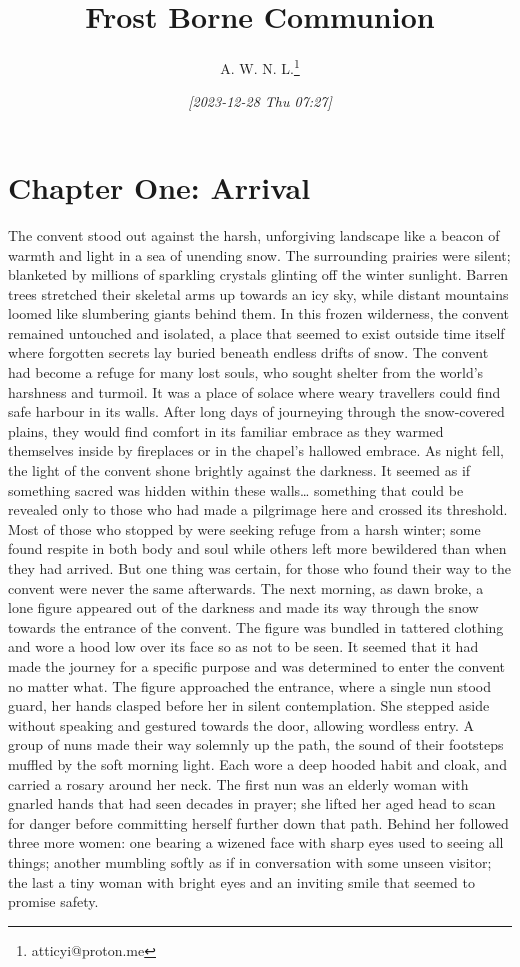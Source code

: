 \documentclass[11pt]{article}
\author{A. W. N. L.\thanks{atticyi@proton.me}}
\date{\textit{[2023-12-28 Thu 07:27]}}
\title{Frost Borne Communion}
\begin{document}
\maketitle
\tableofcontents

\section{Chapter One: Arrival}
\label{sec:orge59237a}
The convent stood out against the harsh, unforgiving landscape like a beacon of warmth and light in a sea of unending snow. The surrounding prairies were silent; blanketed by millions of sparkling crystals glinting off the winter sunlight. Barren trees stretched their skeletal arms up towards an icy sky, while distant mountains loomed like slumbering giants behind them. In this frozen wilderness, the convent remained untouched and isolated, a place that seemed to exist outside time itself where forgotten secrets lay buried beneath endless drifts of snow.
The convent had become a refuge for many lost souls, who sought shelter from the world's harshness and turmoil. It was a place of solace where weary travellers could find safe harbour in its walls. After long days of journeying through the snow-covered plains, they would find comfort in its familiar embrace as they warmed themselves inside by fireplaces or in the chapel's hallowed embrace.
As night fell, the light of the convent shone brightly against the darkness. It seemed as if something sacred was hidden within these walls\ldots{} something that could be revealed only to those who had made a pilgrimage here and crossed its threshold.
Most of those who stopped by were seeking refuge from a harsh winter; some found respite in both body and soul while others left more bewildered than when they had arrived. But one thing was certain, for those who found their way to the convent were never the same afterwards.
The next morning, as dawn broke, a lone figure appeared out of the darkness and made its way through the snow towards the entrance of the convent. The figure was bundled in tattered clothing and wore a hood low over its face so as not to be seen. It seemed that it had made the journey for a specific purpose and was determined to enter the convent no matter what.
The figure approached the entrance, where a single nun stood guard, her hands clasped before her in silent contemplation. She stepped aside without speaking and gestured towards the door, allowing wordless entry. A group of nuns made their way solemnly up the path, the sound of their footsteps muffled by the soft morning light. Each wore a deep hooded habit and cloak, and carried a rosary around her neck. The first nun was an elderly woman with gnarled hands that had seen decades in prayer; she lifted her aged head to scan for danger before committing herself further down that path. Behind her followed three more women: one bearing a wizened face with sharp eyes used to seeing all things; another mumbling softly as if in conversation with some unseen visitor; the last a tiny woman with bright eyes and an inviting smile that seemed to promise safety.
\end{document}
